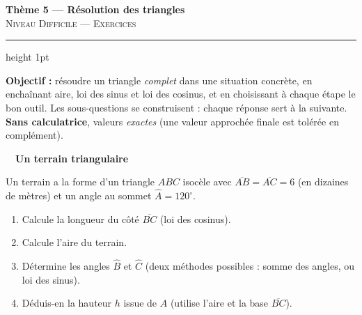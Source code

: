 \documentclass[11pt,a4paper]{article}
\newcommand{\degr}{^{\circ}}
\newcounter{exo}
\newcommand{\exo}[1]{\medskip\refstepcounter{exo}%
  \noindent{\large\bfseries\color{primarydark}Exercice \theexo}%
  \ \textcolor{primary}{\textbullet}\ \textbf{#1}\par\nopagebreak\smallskip}
\begin{document}
\begin{center}
{\LARGE\bfseries\color{primary}Thème 5 — Résolution des triangles}\\[2pt]
{\color{primarydark}\textsc{Niveau Difficile — Exercices}}
\end{center}
\hrule height 1pt
\medskip

\begin{consigne}
\textbf{Objectif :} résoudre un triangle \emph{complet} dans une situation concrète, en enchaînant
aire, loi des sinus et loi des cosinus, et en choisissant à chaque étape le bon outil. Les
sous-questions se construisent : chaque réponse sert à la suivante. \textbf{Sans calculatrice},
valeurs \emph{exactes} (une valeur approchée finale est tolérée en complément).
\end{consigne}

\exo{Un terrain triangulaire}
Un terrain a la forme d'un triangle $ABC$ isocèle avec $\overline{AB}=\overline{AC}=6$ (en dizaines de
mètres) et un angle au sommet $\hat A=120\degr$.
\begin{center}
\end{center}
\begin{enumerate}[label=\textbf{(\alph*)},leftmargin=2em,itemsep=2pt]
\item Calcule la longueur du côté $\overline{BC}$ (loi des cosinus).
\item Calcule l'aire du terrain.
\item Détermine les angles $\hat B$ et $\hat C$ (deux méthodes possibles : somme des angles, ou loi des sinus).
\item Déduis-en la hauteur $h$ issue de $A$ (utilise l'aire et la base $\overline{BC}$).
\end{enumerate}
\end{document}
